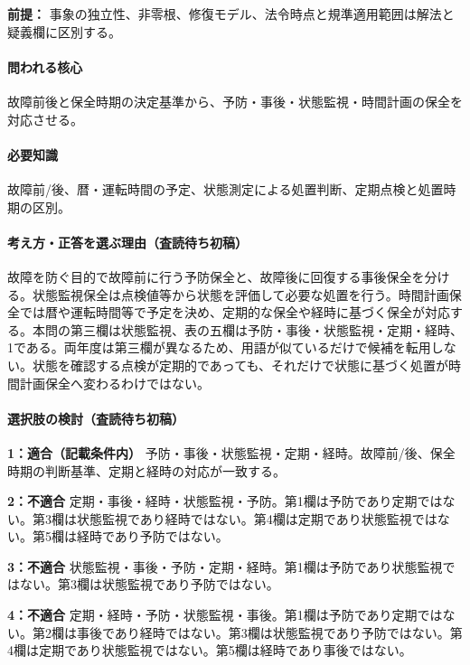 \noindent\textbf{前提：} 事象の独立性、非零根、修復モデル、法令時点と規準適用範囲は解法と疑義欄に区別する。\par

\paragraph{問われる核心} 故障前後と保全時期の決定基準から、予防・事後・状態監視・時間計画の保全を対応させる。

\paragraph{必要知識} 故障前/後、暦・運転時間の予定、状態測定による処置判断、定期点検と処置時期の区別。

\paragraph{考え方・正答を選ぶ理由（査読待ち初稿）} 故障を防ぐ目的で故障前に行う予防保全と、故障後に回復する事後保全を分ける。状態監視保全は点検値等から状態を評価して必要な処置を行う。時間計画保全では暦や運転時間等で予定を決め、定期的な保全や経時に基づく保全が対応する。本問の第三欄は状態監視、表の五欄は予防・事後・状態監視・定期・経時、1である。両年度は第三欄が異なるため、用語が似ているだけで候補を転用しない。状態を確認する点検が定期的であっても、それだけで状態に基づく処置が時間計画保全へ変わるわけではない。

\paragraph{選択肢の検討（査読待ち初稿）}\mbox{}\par

\noindent\textbf{1：適合（記載条件内）} 予防・事後・状態監視・定期・経時。故障前/後、保全時期の判断基準、定期と経時の対応が一致する。\par

\noindent\textbf{2：不適合} 定期・事後・経時・状態監視・予防。第1欄は予防であり定期ではない。第3欄は状態監視であり経時ではない。第4欄は定期であり状態監視ではない。第5欄は経時であり予防ではない。\par

\noindent\textbf{3：不適合} 状態監視・事後・予防・定期・経時。第1欄は予防であり状態監視ではない。第3欄は状態監視であり予防ではない。\par

\noindent\textbf{4：不適合} 定期・経時・予防・状態監視・事後。第1欄は予防であり定期ではない。第2欄は事後であり経時ではない。第3欄は状態監視であり予防ではない。第4欄は定期であり状態監視ではない。第5欄は経時であり事後ではない。\par

